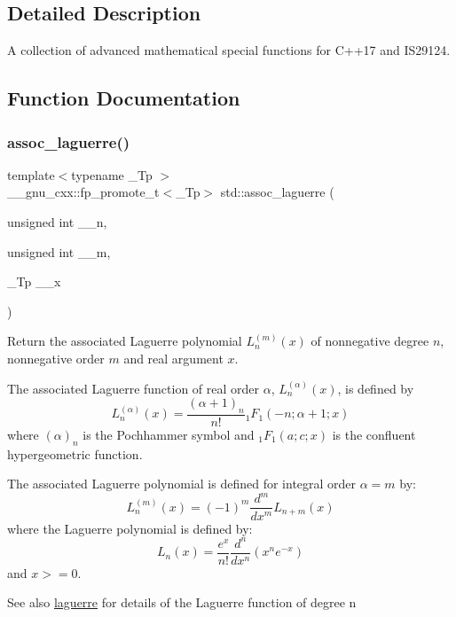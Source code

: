 \subsection{Detailed Description}
A collection of advanced mathematical special functions for C++17 and I\+S29124. 

\subsection{Function Documentation}
\mbox{\label{group__cxx17__math__spec__func_ga0b33e0ac3066f2353861ce2f34b43f57}} 
\subsubsection{\texorpdfstring{assoc\+\_\+laguerre()}{assoc\_laguerre()}\hspace{0.1cm}{\footnotesize\ttfamily [1/2]}}
{\footnotesize\ttfamily template$<$typename \+\_\+\+Tp $>$ \\
\+\_\+\+\_\+gnu\+\_\+cxx\+::fp\+\_\+promote\+\_\+t$<$\+\_\+\+Tp$>$ std\+::assoc\+\_\+laguerre (\begin{DoxyParamCaption}\item[{unsigned int}]{\+\_\+\+\_\+n,  }\item[{unsigned int}]{\+\_\+\+\_\+m,  }\item[{\+\_\+\+Tp}]{\+\_\+\+\_\+x }\end{DoxyParamCaption})\hspace{0.3cm}{\ttfamily [inline]}}

Return the associated Laguerre polynomial $ L_n^{(m)}(x) $ of nonnegative degree $ n $, nonnegative order $ m $ and real argument $ x $.

The associated Laguerre function of real order $ \alpha $, $ L_n^{(\alpha)}(x) $, is defined by \[ L_n^{(\alpha)}(x) = \frac{(\alpha + 1)_n}{n!} {}_1F_1(-n; \alpha + 1; x) \] where $ (\alpha)_n $ is the Pochhammer symbol and $ {}_1F_1(a; c; x) $ is the confluent hypergeometric function.

The associated Laguerre polynomial is defined for integral order $ \alpha = m $ by\+: \[ L_n^{(m)}(x) = (-1)^m \frac{d^m}{dx^m} L_{n + m}(x) \] where the Laguerre polynomial is defined by\+: \[ L_n(x) = \frac{e^x}{n!} \frac{d^n}{dx^n} (x^ne^{-x}) \] and $ x >= 0 $. \begin{DoxySeeAlso}{See also}
\hyperlink{group__cxx17__math__spec__func_ga9d7b24a11dad27690387405548973ef9}{laguerre} for details of the Laguerre function of degree {\ttfamily n} 
\end{DoxySeeAlso}

